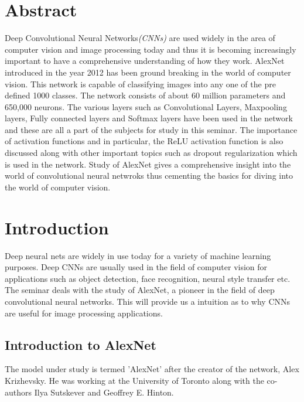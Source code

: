 \documentclass[11pt]{report}
\begin{document}
\chapter*{Abstract}
\doublespacing
Deep Convolutional Neural Networks\textit{(CNNs)} are used widely in the area of computer vision and image processing today and thus it is becoming increasingly important to have a comprehensive understanding of how they work. AlexNet introduced in the year 2012 has been ground breaking in the world of computer vision. This network is capable of classifying images into any one of the pre defined 1000 classes. The network consists of about 60 million parameters and 650,000 neurons. The various layers such as Convolutional Layers, Maxpooling layers, Fully connected layers and Softmax layers have been used in the network and these are all a part of the subjects for study in this seminar. The importance of activation functions and in particular, the ReLU activation function is also discussed along with other important topics such as dropout regularization which is used in the network. Study of AlexNet gives a comprehensive insight into the world of convolutional neural netwroks thus cementing the basics for diving into the world of computer vision.

\newpage
\tableofcontents
\listoffigures
\listoftables

\newpage
{}
\chapter{Introduction}
Deep neural nets are widely in use today for a variety of machine learning purposes. Deep CNNs are usually used in the field of computer vision for applications such as object detection, face recognition, neural style transfer etc. The seminar deals with the study of AlexNet, a pioneer in the field of deep convolutional neural networks. This will provide us a intuition as to why CNNs are useful for image processing applications.
\section{Introduction to AlexNet}
The model under study is termed 'AlexNet' after the creator of the network, Alex Krizhevsky. He was working at the University of Toronto along with the co-authors Ilya Sutskever and Geoffrey E. Hinton.
\end{document}
